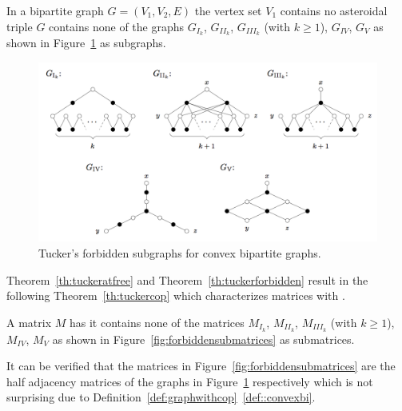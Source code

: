\begin{theoremsansproof}
  In a bipartite graph $G = (V_1, V_2, E)$ the vertex set $V_1$
  contains no asteroidal triple \iff $G$ contains none of the graphs
  $G_{I_k}$, $G_{II_k}$, $G_{III_k}$ (with $k \ge 1$), $G_{IV}$,
  $G_{V}$ as shown in Figure~\ref{fig:forbiddensubgraphs} as subgraphs.
  \label{th:tuckerforbidden}
\end{theoremsansproof}


\begin{figure}[htbp]
  \centering
  \includegraphics[scale=0.35]{../img/tuckersforbiddensubgraphs.png}  
  \caption[\figtabsize Tucker's forbidden subgraphs]{\figtabsize Tucker's
    forbidden subgraphs for convex bipartite graphs. } 
  \label{fig:forbiddensubgraphs}
\end{figure}

Theorem~\ref{th:tuckeratfree} and Theorem~\ref{th:tuckerforbidden}
result in the following Theorem~\ref{th:tuckercop} which characterizes
matrices with \COP.

\begin{theoremsansproof}
  A matrix $M$ has \COP \iff it contains none of the matrices 
$M_{I_k}$, $M_{II_k}$, $M_{III_k}$ (with $k \ge 1$), $M_{IV}$,
  $M_{V}$ as shown in Figure~\ref{fig:forbiddensubmatrices} as submatrices.
  \label{th:tuckercop}
\end{theoremsansproof}

\figforbiddensubmatrices

It can be verified that the matrices in
Figure~\ref{fig:forbiddensubmatrices} are the half adjacency matrices
of the graphs in Figure~\ref{fig:forbiddensubgraphs} respectively
which is not surprising due to
Definition~\ref{def:graphwithcop}~\ref{def::convexbi}.

